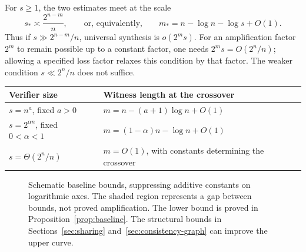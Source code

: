 \documentclass[11pt]{article}
\theoremstyle{definition}
\theoremstyle{remark}
\begin{document}
For $s\ge1$, the two estimates meet at the scale
\begin{equation}\label{eq:crossover}
 s_*\asymp\frac{2^{n-m}}n,
 \qquad\text{or, equivalently,}\qquad
 m_* = n-\log n-\log s+O(1).
\end{equation}
Thus if $s\gg2^{n-m}/n$, universal synthesis is $o(2^m s)$.
For an amplification factor $2^m$ to remain possible up to a constant
factor, one needs $2^m s=O(2^n/n)$; allowing a specified loss factor
relaxes this condition by that factor. The weaker condition
$s\ll2^n/n$ does not suffice.

\begin{center}
\begin{tabularx}{\linewidth}{@{}lX@{}}
\toprule
Verifier size & Witness length at the crossover \\
\midrule
$s=n^a$, fixed $a>0$ & $m=n-(a+1)\log n+O(1)$ \\
$s=2^{\alpha n}$, fixed $0<\alpha<1$
  & $m=(1-\alpha)n-\log n+O(1)$ \\
$s=\Theta(2^n/n)$ & $m=O(1)$, with constants determining the crossover \\
\bottomrule
\end{tabularx}
\end{center}

\begin{figure}[htbp]
\centering
{}
\caption{Schematic baseline bounds, suppressing additive constants on
logarithmic axes. The shaded region represents a gap between bounds,
not proved amplification. The lower bound is proved in
Proposition~\ref{prop:baseline}. The structural bounds in
Sections~\ref{sec:sharing} and~\ref{sec:consistency-graph} can improve the upper curve.}
\label{fig:envelope}
\end{figure}
\end{document}
